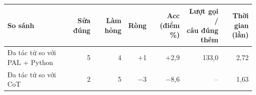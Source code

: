 \begin{tabular}{lrrrrrr}
\toprule
So sánh & Sửa đúng & Làm hỏng & Ròng & \makecell[r]{Acc (điểm\\\%)} & \makecell[r]{Lượt gọi /\\câu đúng thêm} & \makecell[r]{Thời gian\\(lần)} \\
\midrule
Đa tác tử so với PAL + Python & 5 & 4 & \ensuremath{+}1 & \ensuremath{+}2{,}9 & 133{,}0 & 2{,}72 \\
Đa tác tử so với CoT & 2 & 5 & \ensuremath{-}3 & \ensuremath{-}8{,}6 & -- & 1{,}63 \\
\bottomrule
\end{tabular}
